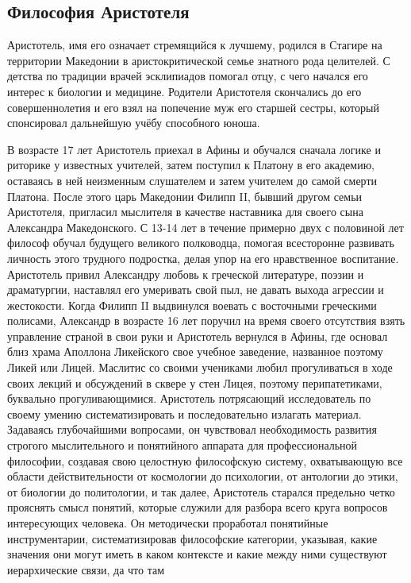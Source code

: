 \subsection{Философия Аристотеля}

Аристотель, имя его означает стремящийся к лучшему, родился в Стагире на
территории Македонии в аристокритической семье знатного рода целителей. С
детства по традиции врачей эсклипиадов помогал отцу, с чего начался его интерес
к биологии и медицине. Родители Аристотеля скончались до его совершеннолетия и
его взял на попечение муж его старшей сестры, который спонсировал дальнейшую
учёбу способного юноша. 

В возрасте 17 лет Аристотель приехал в Афины и обучался
сначала логике и риторике у известных учителей, затем поступил к Платону в его
академию, оставаясь в ней неизменным слушателем и затем учителем до самой смерти
Платона. После этого царь Македонии Филипп II, бывший другом семьи Аристотеля,
пригласил мыслителя в качестве наставника для своего сына Александра
Македонского. С 13-14 лет в течение примерно двух с половиной лет философ обучал
будущего великого полководца, помогая всесторонне развивать личность этого
трудного подростка, делая упор на его нравственное воспитание. Аристотель привил
Александру любовь к греческой литературе, поэзии и драматургии, наставлял его
умеривать свой пыл, не давать выхода агрессии и жестокости. Когда Филипп II
выдвинулся воевать с восточными греческими полисами, Александр в возрасте 16 лет
поручил на время своего отсутствия взять управление страной в свои руки и
Аристотель вернулся в Афины, где основал близ храма Аполлона Ликейского свое
учебное заведение, названное поэтому Ликей или Лицей. Маслитис со своими
учениками любил прогуливаться в ходе своих лекций и обсуждений в сквере у стен
Лицея, поэтому перипатетиками, буквально прогуливающимися. Аристотель
потрясающий исследователь по своему умению систематизировать и последовательно
излагать материал. Задаваясь глубочайшими вопросами, он чувствовал необходимость
развития строгого мыслительного и понятийного аппарата для профессиональной
философии, создавая свою целостную философскую систему, охватывающую все области
действительности от космологии до психологии, от антологии до этики, от биологии
до политологии, и так далее, Аристотель старался предельно четко прояснять смысл
понятий, которые служили для разбора всего круга вопросов интересующих человека.
Он методически проработал понятийные инструментарии, систематизировав
философские категории, указывая, какие значения они могут иметь в каком
контексте и какие между ними существуют иерархические связи, да что там
